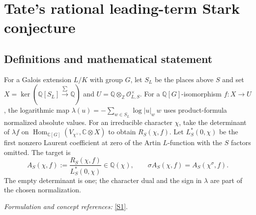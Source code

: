 \documentclass[11pt,a4paper]{article}
\newcommand{\Z}{\mathbb{Z}}
\newcommand{\Q}{\mathbb{Q}}
\newcommand{\C}{\mathbb{C}}
\newcommand{\sref}[2]{\hyperlink{source:#1:#2}{[S#2]}}
\newif\ifshowcatalogue
\newcommand{\cataloguescope}[1]{\ifshowcatalogue
 \paragraph{Exact scope in the supplied catalogue.}
 \begin{quote}\small #1\end{quote}\fi}
\numberwithin{equation}{section}
\begin{document}
\setcounter{section}{0}
\clearpage
\section*{\texorpdfstring{Tate's rational leading-term Stark conjecture}{Tate's rational leading-term Stark conjecture}}\label{30006764}
\subsection{Definitions and mathematical statement}
For a Galois extension $L/K$ with group $G$, let $S_L$ be the places above $S$ and set
$X=\ker(\Q[S_L]\xrightarrow{\sum}\Q)$ and
$U=\Q\otimes_{\Z}\mathcal O_{L,S}^{\times}$. For a $\Q[G]$-isomorphism $f:X\to U$, the logarithmic map
$\lambda(u)=-\sum_{w\in S_L}\log|u|_w\,w$
uses product-formula normalized absolute values. For an irreducible character $\chi$, take the determinant of $\lambda f$ on
$\operatorname{Hom}_{\C[G]}(V_{\chi^\vee},\C\otimes X)$ to obtain $R_S(\chi,f)$. Let $L_S^*(0,\chi)$ be the first nonzero Laurent coefficient at zero of the Artin $L$-function with the $S$ factors omitted. The target is
\[
 A_S(\chi,f):=\frac{R_S(\chi,f)}{L_S^*(0,\chi)}\in\Q(\chi),
 \qquad\sigma A_S(\chi,f)=A_S(\chi^\sigma,f).
\]
The empty determinant is one; the character dual and the sign in $\lambda$ are part of the chosen normalization.
\par\smallskip\textit{Formulation and concept references:} \sref{30006764}{1}.
\cataloguescope{For every finite Galois extension L/K of number fields with group G, let S be any finite set of places of K containing the archimedean and ramified places. Let X be the augmentation kernel of the free Q-module on places of L above S, U=Q tensor\_Z O\_(L,S)\textasciicircum{}*, and f:X->U any Q[G]-isomorphism. Define lambda:R tensor U->R tensor X by lambda(u)=-sum\_w log|u|\_w w, using product-formula normalized absolute values. For each irreducible complex character chi of G, set R\_S(chi,f)=det\_C(lambda f acting by postcomposition on Hom\_C[G](V\_(dual chi),C tensor X)) and A\_S(chi,f)=R\_S(chi,f)/L\_S\textasciicircum{}*(0,chi), where L\_S\textasciicircum{}* is the first nonzero Laurent coefficient of the S-truncated Artin L-function and an empty determinant is1. Is A\_S(chi,f) in Q(chi), with sigma(A\_S(chi,f))=A\_S(chi\textasciicircum{}sigma,f) for every sigma in Aut(C)?}
\end{document}
